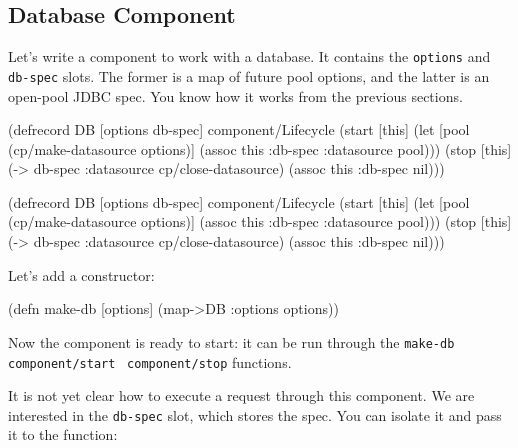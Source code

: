 
\subsection{Database Component}

Let's write a component to work with a database. It contains the \verb|options| and \verb|db-spec| slots. The former is a map of future pool options, and the latter is an open-pool JDBC spec. You know how it works from the previous sections.

\ifnarrow

\begin{english}
  \begin{clojure}
(defrecord DB [options db-spec]
  component/Lifecycle
  (start [this]
    (let [pool (cp/make-datasource
                 options)]
      (assoc this :db-spec
        {:datasource pool})))
  (stop [this]
    (-> db-spec
        :datasource
        cp/close-datasource)
    (assoc this :db-spec nil)))
  \end{clojure}
\end{english}

\else

\begin{english}
  \begin{clojure}
(defrecord DB [options db-spec]
  component/Lifecycle
  (start [this]
    (let [pool (cp/make-datasource options)]
      (assoc this :db-spec {:datasource pool})))
  (stop [this]
    (-> db-spec :datasource cp/close-datasource)
    (assoc this :db-spec nil)))
  \end{clojure}
\end{english}

\fi

\noindent
Let's add a constructor:

\begin{english}
  \begin{clojure}
(defn make-db [options]
  (map->DB {:options options}))
  \end{clojure}
\end{english}

Now the component is ready to start: it can be run through the \verb|make-db|~\arr{} \texttt{component\-/start}~\arr{} \verb|component/stop| functions.

It is not yet clear how to execute a request through this component. We are interested in the \verb|db-spec| slot, which stores the spec. You can isolate it and pass it to the function:

